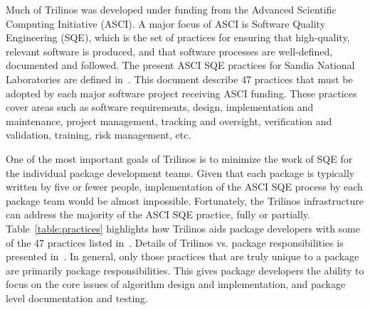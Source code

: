 \documentclass[acmtoms,acmnow]{acmtrans2m}
\begin{document}
Much of Trilinos was developed under funding from the Advanced
Scientific Computing Initiative (ASCI).  A major focus of ASCI is
Software Quality Engineering (SQE), which is the set of practices for
ensuring that
high-quality, relevant software is produced, and that software
processes are well-defined, documented and followed.  The present ASCI
SQE practices for Sandia National Laboratories are defined
in~\cite{ASCISQE2003}.  This document describe 47 practices that must
be adopted by each major software project receiving ASCI funding.
These practices cover areas such as software requirements, design,
implementation and maintenance, project management, tracking and
oversight, verification and validation, training, risk management,
etc.  

One of the most important goals of Trilinos is to minimize the work
of SQE for the individual package development teams.  Given
that each package is typically written by five or fewer people,
implementation of the ASCI SQE process by each package team would be
almost impossible.  Fortunately, the Trilinos infrastructure
can address the majority of the ASCI SQE practice, fully or
partially.  Table~\ref{table:practices} highlights how Trilinos aids
package developers with some of the 47 practices listed in~\cite{ASCISQE2003}.
Details of Trilinos vs. package responsibilities is presented 
in~\cite{Trilinos-Dev-Guide-II}.   In general, only those practices that are truly
unique to a package are primarily package responsibilities.  This gives
package developers the ability to focus on the core issues of
algorithm design and implementation, and package level documentation
and testing.
\end{document}
